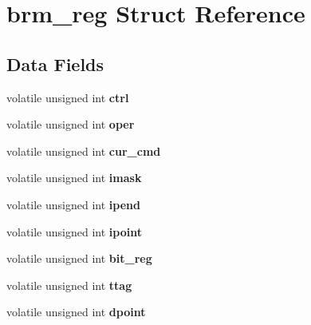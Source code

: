 \hypertarget{structbrm__reg}{}\section{brm\+\_\+reg Struct Reference}
\label{structbrm__reg}
\subsection*{Data Fields}
\begin{DoxyCompactItemize}
\item 
\mbox{\label{structbrm__reg_ae44a32a4911bef5afc715779d4d1704f}} 
volatile unsigned int {\bfseries ctrl}
\item 
\mbox{\label{structbrm__reg_a19645e988c8add7ea49a4fe20de3e5b7}} 
volatile unsigned int {\bfseries oper}
\item 
\mbox{\label{structbrm__reg_a200ada6b9725a0b53b24f0d1b4ca860c}} 
volatile unsigned int {\bfseries cur\+\_\+cmd}
\item 
\mbox{\label{structbrm__reg_a967c9f26eb491704673fd56b405dcf7a}} 
volatile unsigned int {\bfseries imask}
\item 
\mbox{\label{structbrm__reg_a2bb76d89707365181cfd487afe05aedb}} 
volatile unsigned int {\bfseries ipend}
\item 
\mbox{\label{structbrm__reg_a21a8f4f0080d1e5c072ac197096afaeb}} 
volatile unsigned int {\bfseries ipoint}
\item 
\mbox{\label{structbrm__reg_afd5c0b65b38b451a736a491296be9ca3}} 
volatile unsigned int {\bfseries bit\+\_\+reg}
\item 
\mbox{\label{structbrm__reg_a7adabca7ff6e6023276d8d1ed9888f66}} 
volatile unsigned int {\bfseries ttag}
\item 
\mbox{\label{structbrm__reg_a49c2faeaa0c4d63cbd1cf48f68a31916}} 
volatile unsigned int {\bfseries dpoint}
\item 
\mbox{\label{structbrm__reg_aa86d139558fd6a8216a24282bcce89f0}} 

\end{DoxyCompactItemize}
